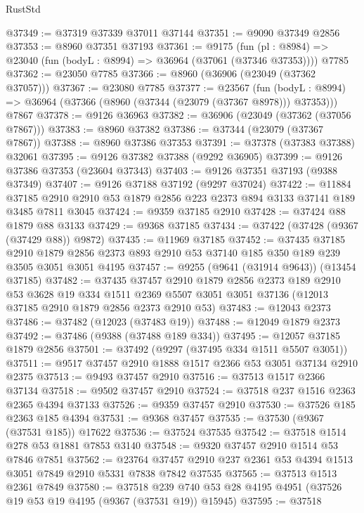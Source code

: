 \begin{lexlean}{RustStd}
\begin{coremodule}
@37349 := @37319 @37339 @37011 @37144
@37351 := @9090 @37349 @2856
@37353 := @8960 @37351 @37193
@37361 := @9175
    (fun (pl : @8984) => @23040 (fun (bodyL : @8994) => @36964 (@37061 (@37346 @37353))))
    @7785
@37362 := @23050 @7785
@37366 := @8960 (@36906 (@23049 (@37362 @37057)))
@37367 := @23080 @7785
@37377 := @23567
    (fun (bodyL : @8994) => @36964 (@37366 (@8960 (@37344 (@23079 (@37367 @8978))) @37353)))
    @7867
@37378 := @9126 @36963
@37382 := @36906 (@23049 (@37362 (@37056 @7867)))
@37383 := @8960 @37382
@37386 := @37344 (@23079 (@37367 @7867))
@37388 := @8960 @37386 @37353
@37391 := @37378 (@37383 @37388) @32061
@37395 := @9126 @37382 @37388 (@9292 @36905)
@37399 := @9126 @37386 @37353 (@23604 @37343)
@37403 := @9126 @37351 @37193 (@9388 @37349)
@37407 := @9126 @37188 @37192 (@9297 @37024)
@37422 := @11884
    @37185
    @2910
    @2910
    @53
    @1879
    @2856
    @223
    @2373
    @894
    @3133
    @37141
    @189
    @3485
    @7811
    @3045
@37424 := @9359 @37185 @2910
@37428 := @37424 @88 @1879 @88 @3133
@37429 := @9368 @37185
@37434 := @37422 (@37428 (@9367 (@37429 @88)) @9872)
@37435 := @11969 @37185
@37452 := @37435
    @37185
    @2910
    @1879
    @2856
    @2373
    @893
    @2910
    @53
    @37140
    @185
    @350
    @189
    @239
    @3505
    @3051
    @3051
    @4195
@37457 := @9255 (@9641 (@31914 @9643)) (@13454 @37185)
@37482 := @37435
    @37457
    @2910
    @1879
    @2856
    @2373
    @189
    @2910
    @53
    @3628
    @19
    @334
    @1511
    @2369
    @5507
    @3051
    @3051
    @37136
    (@12013 @37185 @2910 @1879 @2856 @2373 @2910 @53)
@37483 := @12043 @2373
@37486 := @37482 (@12023 (@37483 @19))
@37488 := @12049 @1879 @2373
@37492 := @37486 (@9388 (@37488 @189 @334))
@37495 := @12057 @37185 @1879 @2856
@37501 := @37492 (@9297 (@37495 @334 @1511 @5507 @3051))
@37511 := @9517 @37457 @2910 @1888 @1517 @2366 @53 @3051 @37134 @2910 @2375
@37513 := @9493 @37457 @2910
@37516 := @37513 @1517 @2366 @37134
@37518 := @9502 @37457 @2910
@37524 := @37518 @237 @1516 @2363 @2365 @4394 @37133
@37526 := @9359 @37457 @2910
@37530 := @37526 @185 @2363 @185 @4394
@37531 := @9368 @37457
@37535 := @37530 (@9367 (@37531 @185)) @17622
@37536 := @37524 @37535
@37542 := @37518 @1514 @278 @53 @1881 @7853 @3140
@37548 := @9320 @37457 @2910 @1514 @53 @7846 @7851
@37562 := @23764 @37457 @2910 @237 @2361 @53 @4394 @1513 @3051 @7849 @2910 @5331 @7838 @7842 @37535
@37565 := @37513 @1513 @2361 @7849
@37580 := @37518
    @239
    @740
    @53
    @28
    @4195
    @4951
    (@37526 @19 @53 @19 @4195 (@9367 (@37531 @19)) @15945)
@37595 := @37518

\end{coremodule}
\end{lexlean}
